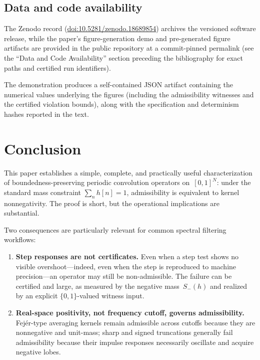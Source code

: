 \documentclass[11pt,a4paper]{article}
\theoremstyle{plain}
\theoremstyle{definition}
\theoremstyle{plain}
\newcommand{\Sminus}{S_{-}}
\begin{document}
\subsection{Data and code availability}

The Zenodo record
(\href{https://doi.org/10.5281/zenodo.18689854}{doi:10.5281/zenodo.18689854})
archives the versioned software release, while the paper's figure-generation demo
and pre-generated figure artifacts are provided in the public repository at a
commit-pinned permalink (see the ``Data and Code Availability'' section preceding
the bibliography for exact paths and certified run identifiers).

The demonstration produces a self-contained JSON artifact containing the
numerical values underlying the figures (including the admissibility witnesses and
the certified violation bounds), along with the specification and determinism
hashes reported in the text.


\section{Conclusion}
\label{sec:conclusion}

This paper establishes a simple, complete, and practically useful
characterization of boundedness-preserving periodic convolution operators
on~$[0,1]^N$: under the standard mass constraint $\sum_n h[n] = 1$,
admissibility is equivalent to kernel nonnegativity.  The proof is short, but the
operational implications are substantial.

Two consequences are particularly relevant for common spectral filtering
workflows:

\begin{enumerate}[label=\arabic*.,leftmargin=2em]
  \item \textbf{Step responses are not certificates.}  Even when a step test
    shows no visible overshoot---indeed, even when the step is reproduced to
    machine precision---an operator may still be non-admissible.  The failure can
    be certified and large, as measured by the negative mass~$\Sminus(h)$ and
    realized by an explicit $\{0,1\}$-valued witness input.

  \item \textbf{Real-space positivity, not frequency cutoff, governs
    admissibility.}  Fej\'er-type averaging kernels remain admissible across
    cutoffs because they are nonnegative and unit-mass; sharp and signed
    truncations generally fail admissibility because their impulse responses
    necessarily oscillate and acquire negative lobes.
\end{enumerate}
\end{document}
